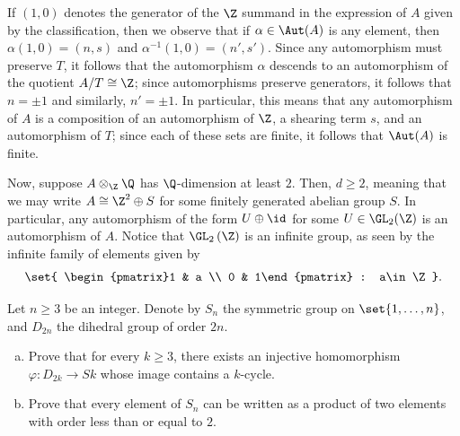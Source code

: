 \documentclass[10pt]{mypackage}
\begin{document}
\begin{solution}
\begin{enumerate}[(i)]
      If $\left( 1,0 \right)$ denotes the generator of the $\Z$ summand in the expression of $A$ given by the classification, then we observe that if $\alpha\in \Aut(A)$ is any element, then $\alpha\left( 1,0 \right) = \left( n,s \right)$ and $\alpha^{-1}\left( 1,0 \right) = \left( n',s' \right)$. Since any automorphism must preserve $T$, it follows that the automorphism $\alpha$ descends to an automorphism of the quotient $A/T\cong \Z$; since automorphisms preserve generators, it follows that $n = \pm 1$ and similarly, $n' = \pm 1$. In particular, this means that any automorphism of $A$ is a composition of an automorphism of $\Z$, a shearing term $s$, and an automorphism of $T$; since each of these sets are finite, it follows that $\Aut(A)$ is finite.
  \end{enumerate}
  Now, suppose $A\otimes_{\Z}\Q$ has $\Q$-dimension at least $2$. Then, $d \geq 2$, meaning that we may write $A\cong \Z^2\oplus S$ for some finitely generated abelian group $S$. In particular, any automorphism of the form $U\oplus \id$ for some $U\in \GL_2(\Z)$ is an automorphism of $A$. Notice that $\GL_2\left( \Z \right)$ is an infinite group, as seen by the infinite family of elements given by
  \begin{align*}
    \set{ \begin{pmatrix}1 & a \\ 0 & 1\end{pmatrix} : a\in \Z }.
  \end{align*}
\end{solution}
\begin{problem}[Problem 2]
  Let $n\geq 3$ be an integer. Denote by $S_n$ the symmetric group on $\set{1,\dots,n}$, and $D_{2n}$ the dihedral group of order $2n$.
  \begin{enumerate}[(a)]
    \item Prove that for every $k\geq 3$, there exists an injective homomorphism $\varphi\colon D_{2k}\rightarrow Sk$ whose image contains a $k$-cycle.
    \item Prove that every element of $S_n$ can be written as a product of two elements with order less than or equal to $2$.
  \end{enumerate}
\end{problem}
\end{document}
